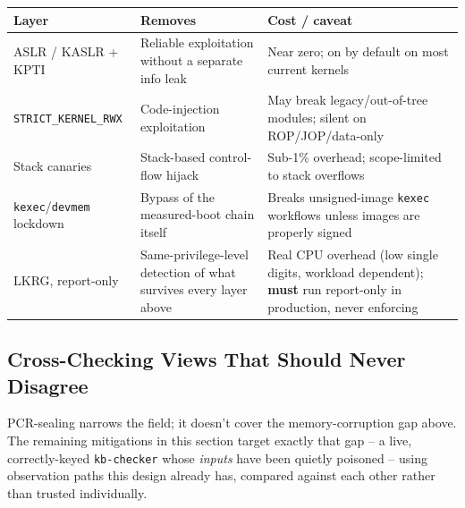 \documentclass[11pt,a4paper]{article}
\begin{document}
\begin{center}
\renewcommand{\arraystretch}{1.5}
\small
\begin{tabular}{@{}p{3.2cm}p{5.7cm}p{4.1cm}@{}}
\toprule
\textbf{Layer} & \textbf{Removes} & \textbf{Cost / caveat} \\
\midrule
ASLR / KASLR + KPTI & Reliable exploitation without a separate info
leak & Near zero; on by default on most current kernels \\
\texttt{STRICT\_KERNEL\_RWX} & Code-injection exploitation & May break
legacy/out-of-tree modules; silent on ROP/JOP/data-only \\
Stack canaries & Stack-based control-flow hijack & Sub-1\% overhead;
scope-limited to stack overflows \\
\texttt{kexec}/\texttt{devmem} lockdown & Bypass of the measured-boot
chain itself & Breaks unsigned-image \texttt{kexec} workflows unless
images are properly signed \\
LKRG, report-only & Same-privilege-level detection of what survives
every layer above & Real CPU overhead (low single digits, workload
dependent); \textbf{must} run report-only in production, never
enforcing \\
\bottomrule
\end{tabular}
\end{center}

\subsection{Cross-Checking Views That Should Never Disagree}
\label{sec:cross-consistency}

PCR-sealing narrows the field; it doesn't cover the memory-corruption
gap above. The remaining mitigations in this section target exactly
that gap -- a live, correctly-keyed \texttt{kb-checker} whose
\emph{inputs} have been quietly poisoned -- using observation paths
this design already has, compared against each other rather than
trusted individually.
\end{document}
